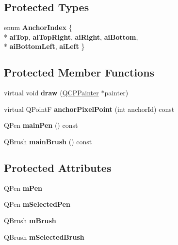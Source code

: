 \subsection*{Protected Types}
\begin{DoxyCompactItemize}
\item 
enum {\bfseries Anchor\-Index} \{ \\*
{\bfseries ai\-Top}, 
{\bfseries ai\-Top\-Right}, 
{\bfseries ai\-Right}, 
{\bfseries ai\-Bottom}, 
\\*
{\bfseries ai\-Bottom\-Left}, 
{\bfseries ai\-Left}
 \}
\end{DoxyCompactItemize}
\subsection*{Protected Member Functions}
\begin{DoxyCompactItemize}
\item 
\hypertarget{classQCPItemRect_a18cd583638b876cdd50f1a155ec182aa}{virtual void {\bfseries draw} (\hyperlink{classQCPPainter}{Q\-C\-P\-Painter} $\ast$painter)}\label{classQCPItemRect_a18cd583638b876cdd50f1a155ec182aa}

\item 
\hypertarget{classQCPItemRect_ae0973f8281fb52361b0c99ee899be07e}{virtual Q\-Point\-F {\bfseries anchor\-Pixel\-Point} (int anchor\-Id) const }\label{classQCPItemRect_ae0973f8281fb52361b0c99ee899be07e}

\item 
\hypertarget{classQCPItemRect_afa0fb7c6328a1e197ecd537de36daf8f}{Q\-Pen {\bfseries main\-Pen} () const }\label{classQCPItemRect_afa0fb7c6328a1e197ecd537de36daf8f}

\item 
\hypertarget{classQCPItemRect_ab0bd8e272e822ec851ba5b0c20e9200e}{Q\-Brush {\bfseries main\-Brush} () const }\label{classQCPItemRect_ab0bd8e272e822ec851ba5b0c20e9200e}

\end{DoxyCompactItemize}
\subsection*{Protected Attributes}
\begin{DoxyCompactItemize}
\item 
\hypertarget{classQCPItemRect_aa0d49323628d6752026056bfb52afd86}{Q\-Pen {\bfseries m\-Pen}}\label{classQCPItemRect_aa0d49323628d6752026056bfb52afd86}

\item 
\hypertarget{classQCPItemRect_a73cc0bee61de3c67221ec8c7a76a29ed}{Q\-Pen {\bfseries m\-Selected\-Pen}}\label{classQCPItemRect_a73cc0bee61de3c67221ec8c7a76a29ed}

\item 
\hypertarget{classQCPItemRect_a2d7f207fada27588b3a52b19234d3c2e}{Q\-Brush {\bfseries m\-Brush}}\label{classQCPItemRect_a2d7f207fada27588b3a52b19234d3c2e}

\item 
\hypertarget{classQCPItemRect_a21b70eee59b6e19ae0bbdf037b13508f}{Q\-Brush {\bfseries m\-Selected\-Brush}}\label{classQCPItemRect_a21b70eee59b6e19ae0bbdf037b13508f}

\end{DoxyCompactItemize}
